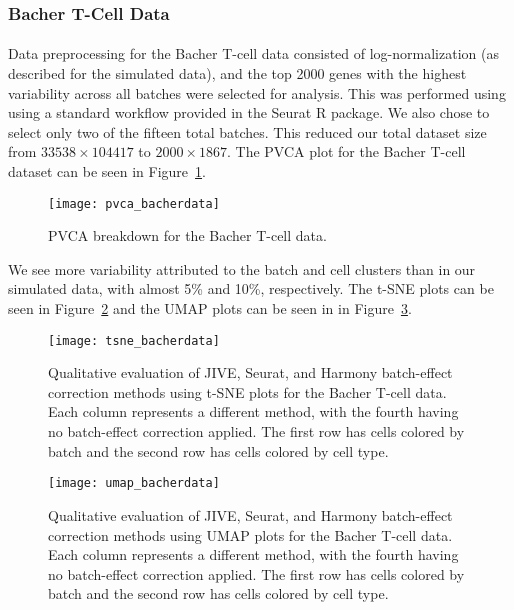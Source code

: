 \documentclass[
12pt, %
letterpaper, %
oneside, %
headinclude,footinclude, %
BCOR5mm, %
]{scrartcl}
\begin{document}
\subsubsection*{Bacher T-Cell Data}

\paragraph*{}
Data preprocessing for the Bacher T-cell data consisted of log-normalization (as described for the simulated data), and the top 2000 genes with the highest variability across all batches were selected for analysis. This was performed using using a standard workflow provided in the Seurat R package. We also chose to select only two of the fifteen total batches. This reduced our total dataset size from $33538 \times 104417$ to $2000 \times 1867$. The PVCA plot for the Bacher T-cell dataset can be seen in Figure~\ref{fig:pvca_bacherdata}.

\begin{figure}[H]
    \centering 
    \texttt{[image: pvca\_bacherdata]} 
    \caption[PVCA Breakdown for the Bacher T-Cell Data]{PVCA breakdown for the Bacher T-cell data.}
    \label{fig:pvca_bacherdata} 
\end{figure}

We see more variability attributed to the batch and cell clusters than in our simulated data, with almost 5\% and 10\%, respectively. The t-SNE plots can be seen in Figure~\ref{fig:tsne_bacherdata} and the UMAP plots can be seen in in Figure~\ref{fig:umap_bacherdata}.

\begin{figure}[H]
    \centering 
    \texttt{[image: tsne\_bacherdata]} 
    \caption[t-SNE Plots for the Bacher T-Cell Data]{Qualitative evaluation of JIVE, Seurat, and Harmony batch-effect correction methods using t-SNE plots for the Bacher T-cell data. Each column represents a different method, with the fourth having no batch-effect correction applied. The first row has cells colored by batch and the second row has cells colored by cell type.}
    \label{fig:tsne_bacherdata}
\end{figure}

\begin{figure}[H]
    \centering 
    \texttt{[image: umap\_bacherdata]} 
    \caption[UMAP Plots for the Bacher T-Cell Data]{Qualitative evaluation of JIVE, Seurat, and Harmony batch-effect correction methods using UMAP plots for the Bacher T-cell data. Each column represents a different method, with the fourth having no batch-effect correction applied. The first row has cells colored by batch and the second row has cells colored by cell type.}
    \label{fig:umap_bacherdata} 
\end{figure}
\end{document}
